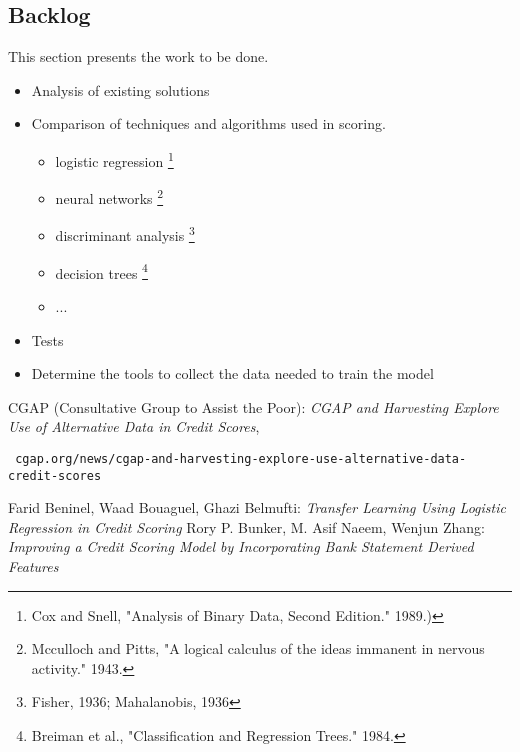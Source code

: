 \documentclass[12pt,a4paper]{amsart}
\numberwithin{equation}{section}
\theoremstyle{plain}
\theoremstyle{definition}
\begin{document}
\subsection{Backlog}
This section presents the work to be done.\\
\begin{itemize}
 \item Analysis of existing solutions
 \item Comparison of techniques and algorithms used in scoring.
\begin{itemize}
  \item logistic regression \footnote{Cox and Snell, "Analysis of Binary Data, Second Edition." 1989.)}
  \item neural networks \footnote{Mcculloch and Pitts, "A logical calculus of the ideas immanent in nervous activity." 1943.}
  \item discriminant analysis \footnote{Fisher, 1936; Mahalanobis, 1936}
  \item decision trees \footnote{Breiman et al., "Classification and Regression Trees." 1984.}
  \item ...
\end{itemize}
 \item Tests
 \item Determine the tools to collect the data needed to train the model

\end{itemize}



\begin{thebibliography}{99} 

 CGAP (Consultative Group to Assist the Poor): \textit{CGAP and Harvesting Explore Use of Alternative Data in Credit Scores}, \begin{verbatim} cgap.org/news/cgap-and-harvesting-explore-use-alternative-data-credit-scores
\end{verbatim}
 Farid Beninel, Waad Bouaguel, Ghazi Belmufti: \textit{Transfer Learning Using Logistic Regression in Credit Scoring}
 Rory P. Bunker, M. Asif Naeem, Wenjun Zhang: \textit{Improving a Credit Scoring Model by Incorporating Bank Statement Derived Features}

\end{thebibliography}
\end{document}
